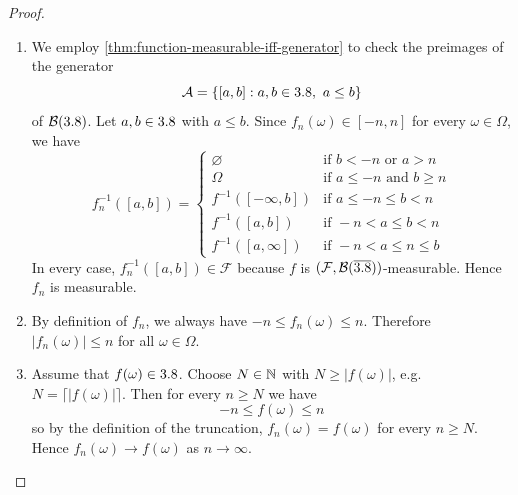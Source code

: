 \begin{proof}
\begin{enumerate}[label=(\alph*)]
\item
We employ \autoref{thm:function-measurable-iff-generator} to check the preimages of the generator
\[
\mathcal{A}
=
\{[a,b] : a,b \in 3.8,\ a \le b\}
\]
of $\mathcal{B}(3.8)$.
Let $a,b \in 3.8$ with $a \le b$.
Since $f_n(\omega) \in [-n,n]$ for every $\omega \in \Omega$,
we have
\[
f_n^{-1}([a,b])
=
\begin{cases}
\varnothing & \text{if } b < -n \text{ or } a > n
\\
\Omega & \text{if } a \le -n \text{ and } b \ge n
\\
f^{-1}([ -\infty, b]) & \text{if } a \le -n \le b < n
\\
f^{-1}([a,b]) & \text{if } -n < a \le b < n
\\
f^{-1}([a,\infty]) & \text{if } -n < a \le n \le b
\end{cases}
\]
In every case, $f_n^{-1}([a,b]) \in \mathcal{F}$ because $f$ is $(\mathcal{F}, \mathcal{B}(\overline{3.8}))$-measurable.
Hence $f_n$ is measurable.

\item
By definition of $f_n$, we always have
\(
-n \le f_n(\omega) \le n
\).
Therefore
\(
|f_n(\omega)| \le n
\)
for all $\omega \in \Omega$.

\item
Assume that $f(\omega) \in 3.8$.
Choose $N \in \mathbb{N}$ with $N \ge |f(\omega)|$, e.g. $N = \lceil |f(\omega)| \rceil$.
Then for every $n \ge N$ we have
\[
-n \le f(\omega) \le n
\]
so by the definition of the truncation,
\(
f_n(\omega) = f(\omega)
\)
for every $n \ge N$.
Hence $f_n(\omega) \to f(\omega)$ as $n \to \infty$.


\end{enumerate}
\end{proof}
